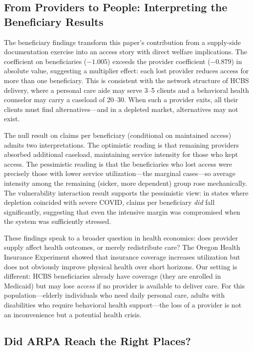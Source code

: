 \documentclass[12pt]{article}
\begin{document}
\subsection{From Providers to People: Interpreting the Beneficiary Results}

The beneficiary findings transform this paper's contribution from a supply-side documentation exercise into an access story with direct welfare implications. The coefficient on beneficiaries ($-1.005$) exceeds the provider coefficient ($-0.879$) in absolute value, suggesting a multiplier effect: each lost provider reduces access for more than one beneficiary. This is consistent with the network structure of HCBS delivery, where a personal care aide may serve 3--5 clients and a behavioral health counselor may carry a caseload of 20--30. When such a provider exits, all their clients must find alternatives---and in a depleted market, alternatives may not exist.

The null result on claims per beneficiary (conditional on maintained access) admits two interpretations. The optimistic reading is that remaining providers absorbed additional caseload, maintaining service intensity for those who kept access. The pessimistic reading is that the beneficiaries who lost access were precisely those with lower service utilization---the marginal cases---so average intensity among the remaining (sicker, more dependent) group rose mechanically. The vulnerability interaction result supports the pessimistic view: in states where depletion coincided with severe COVID, claims per beneficiary \emph{did} fall significantly, suggesting that even the intensive margin was compromised when the system was sufficiently stressed.

These findings speak to a broader question in health economics: does provider supply affect health outcomes, or merely redistribute care? The Oregon Health Insurance Experiment \citep{finkelstein2012,baicker2013} showed that insurance coverage increases utilization but does not obviously improve physical health over short horizons. Our setting is different: HCBS beneficiaries already have coverage (they are enrolled in Medicaid) but may lose \emph{access} if no provider is available to deliver care. For this population---elderly individuals who need daily personal care, adults with disabilities who require behavioral health support---the loss of a provider is not an inconvenience but a potential health crisis.

\subsection{Did ARPA Reach the Right Places?}
\end{document}
